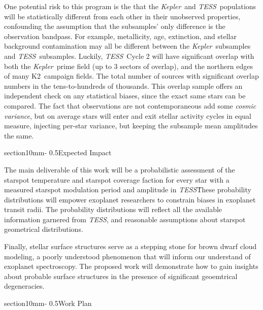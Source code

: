 \documentclass[letterpaper,11pt]{article}
\makeatletter
\renewcommand{\section}{\@startsection%
{section}{1}{0mm}{-\baselineskip}%
{0.5\baselineskip}{\normalfont\Large\bfseries}}%
\newcommand{\tess}{{\it TESS}}
\newcommand{\kepler}{{\it Kepler}}
\newcommand{\ktwo}{{K2}}
\makeatother
\begin{document}
One potential risk to this program is the that the \kepler\ and \tess\ populations will be statistically different from each other in their unobserved properties, confounding the assumption that the subsamples' only difference is the observation bandpass.  For example, metallicity, age, extinction, and stellar background contamination may all be different between the \kepler\ subsamples and \tess\ subsamples.  Luckily, \tess\ Cycle 2 will have significant overlap with both the \kepler\ prime field (up to 3 sectors of overlap), and the northern edges of many \ktwo\ campaign fields.  The total number of sources with significant overlap numbers in the tens-to-hundreds of thousands.  This overlap sample offers an independent check on any statistical biases, since the exact same stars can be compared.  The fact that observations are not contemporaneous add some \emph{cosmic variance}, but on average stars will enter and exit stellar activity cycles in equal measure, injecting per-star variance, but keeping the subsample mean amplitudes the same.

\section{Expected Impact}

The main deliverable of this work will be a probabilistic assessment of the starspot temperature and starspot coverage faction for every star with a measured starspot modulation period and amplitude in \tess\.  These probability distributions will empower exoplanet researchers to constrain biases in exoplanet transit radii.  The probability distributions will reflect all the available information garnered from \tess, and reasonable assumptions about starspot geometrical distributions.

Finally, stellar surface structures serve as a stepping stone for brown dwarf cloud modeling, a poorly understood phenomenon that will inform our understand of exoplanet spectroscopy.  The proposed work will demonstrate how to gain insights about probable surface structures in the presence of significant geoemtrical degeneracies.


\section{Work Plan}
\end{document}
